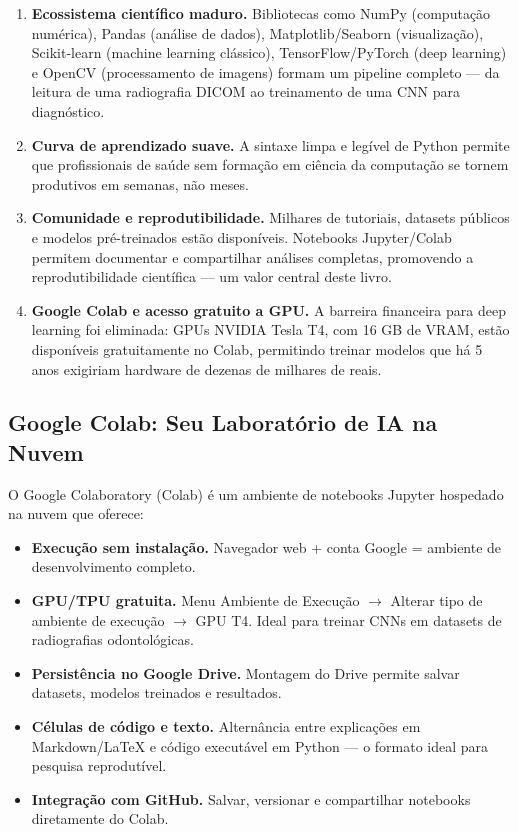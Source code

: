 \begin{enumerate}
    \item \textbf{Ecossistema científico maduro.} Bibliotecas como NumPy (computação numérica), Pandas (análise de dados), Matplotlib/Seaborn (visualização), Scikit-learn (machine learning clássico), TensorFlow/PyTorch (deep learning) e OpenCV (processamento de imagens) formam um pipeline completo — da leitura de uma radiografia DICOM ao treinamento de uma CNN para diagnóstico.
    \item \textbf{Curva de aprendizado suave.} A sintaxe limpa e legível de Python permite que profissionais de saúde sem formação em ciência da computação se tornem produtivos em semanas, não meses.
    \item \textbf{Comunidade e reprodutibilidade.} Milhares de tutoriais, datasets públicos e modelos pré-treinados estão disponíveis. Notebooks Jupyter/Colab permitem documentar e compartilhar análises completas, promovendo a reprodutibilidade científica — um valor central deste livro.
    \item \textbf{Google Colab e acesso gratuito a GPU.} A barreira financeira para deep learning foi eliminada: GPUs NVIDIA Tesla T4, com 16 GB de VRAM, estão disponíveis gratuitamente no Colab, permitindo treinar modelos que há 5 anos exigiriam hardware de dezenas de milhares de reais.
\end{enumerate}

\subsection{Google Colab: Seu Laboratório de IA na Nuvem}

O Google Colaboratory (Colab)  é um ambiente de notebooks Jupyter hospedado na nuvem que oferece:

\begin{itemize}
    \item \textbf{Execução sem instalação.} Navegador web + conta Google = ambiente de desenvolvimento completo.
    \item \textbf{GPU/TPU gratuita.} Menu Ambiente de Execução $\rightarrow$ Alterar tipo de ambiente de execução $\rightarrow$ GPU T4. Ideal para treinar CNNs em datasets de radiografias odontológicas.
    \item \textbf{Persistência no Google Drive.} Montagem do Drive permite salvar datasets, modelos treinados e resultados.
    \item \textbf{Células de código e texto.} Alternância entre explicações em Markdown/LaTeX e código executável em Python — o formato ideal para pesquisa reprodutível.
    \item \textbf{Integração com GitHub.} Salvar, versionar e compartilhar notebooks diretamente do Colab.
\end{itemize}

